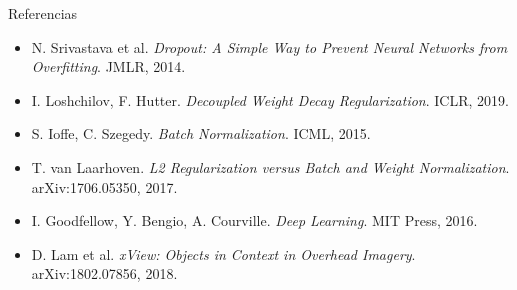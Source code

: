\begin{frame}{Referencias}
  \footnotesize
  \begin{itemize}
    \item N. Srivastava et al. \emph{Dropout: A Simple Way to Prevent Neural Networks from Overfitting}. JMLR, 2014.
    \item I. Loshchilov, F. Hutter. \emph{Decoupled Weight Decay Regularization}. ICLR, 2019.
    \item S. Ioffe, C. Szegedy. \emph{Batch Normalization}. ICML, 2015.
    \item T. van Laarhoven. \emph{L2 Regularization versus Batch and Weight Normalization}. arXiv:1706.05350, 2017.
    \item I. Goodfellow, Y. Bengio, A. Courville. \emph{Deep Learning}. MIT Press, 2016.
    \item D. Lam et al. \emph{xView: Objects in Context in Overhead Imagery}. arXiv:1802.07856, 2018.
  \end{itemize}
\end{frame}
